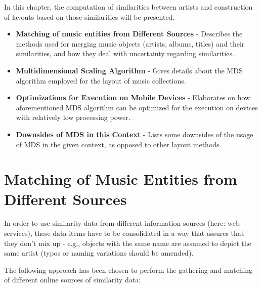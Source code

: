 In this chapter, the computation of similarities between artists and construction of layouts based on those similarities will be presented.

\begin{itemize}
	\item \textbf {Matching of music entities from Different Sources} - Describes the methods used for merging music objects (artists, albums, titles) and their similarities, and how they deal with uncertainty regarding similarities.
	\item \textbf {Multidimensional Scaling Algorithm} - Gives details about the MDS algorithm employed for the layout of music collections.
	\item \textbf {Optimizations for Execution on Mobile Devices} - Elaborates on how aforementioned MDS algorithm can be optimized for the execution on devices with relatively low processing power.
	\item \textbf {Downsides of MDS in this Context} - Lists some downsides of the usage of MDS in the given context, as opposed to other layout methods.
\end{itemize}

\section{Matching of Music Entities from Different Sources}

In order to use similarity data from different information sources (here: web services), these data items have to be consolidated in a way that assures that they don't mix up - e.g., objects with the same name are assumed to depict the same artist (typos or naming variations should be amended).

The following approach has been chosen to perform the gathering and matching of different online sources of similarity data:

